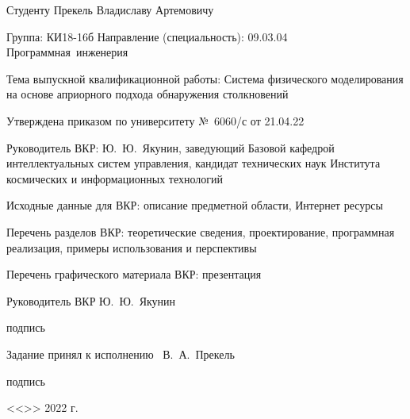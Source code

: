 {
Студенту Прекель Владиславу Артемовичу

Группа: КИ18-16б Направление (специальность): 09.03.04 Программная~инженерия

Тема выпускной квалификационной работы: Система физического моделирования на основе априорного подхода обнаружения столкновений

Утверждена приказом по университету №~6060/с от 21.04.22

Руководитель ВКР: Ю.~Ю.~Якунин, заведующий Базовой кафедрой интеллектуальных систем управления, кандидат технических наук
Института космических и информационных технологий

Исходные данные для ВКР: описание предметной области, Интернет ресурсы

Перечень разделов ВКР: теоретические сведения, проектирование, программная реализация, примеры использования и перспективы

Перечень графического материала ВКР: презентация

\vfill

\begin{spacing}{1}
    \setlength{\parindent}{0cm}

    Руководитель ВКР
    \hfill
    \uline{\hspace{10.5ex}}
    \hspace{6ex}
    Ю.~Ю.~Якунин

    \vspace{-4pt}

    \hfill
    {\footnotesize подпись}
    \hspace{23.3ex}


    Задание принял к исполнению~
    \hfill
    \uline{\hspace{10.5ex}}
    \hspace{7ex}
    В.~А.~Прекель

    \vspace{-4pt}

    \hfill
    {\footnotesize подпись}
    \hspace{23.3ex}

    \vspace{1em}

    \hfill <<\uline{\hspace{3ex}}>> \uline{\hspace{9ex}} 2022 г.

\end{spacing}
}

\thispagestyle{empty}

\clearpage
